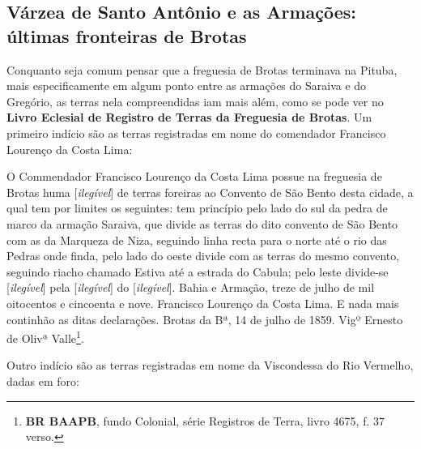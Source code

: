 \subsection{Várzea de Santo Antônio e as Armações: últimas fronteiras de Brotas}

Conquanto seja comum pensar que a freguesia de Brotas terminava na Pituba, mais especificamente em algum ponto entre as armações do Saraiva e do Gregório, as terras nela compreendidas iam mais além, como se pode ver no \textbf{Livro Eclesial de Registro de Terras da Freguesia de Brotas}. Um primeiro indício são as terras registradas em nome do comendador Francisco Lourenço da Costa Lima:

\begin{citacao}
O Commendador Francisco Lourenço da Costa Lima possue na freguesia de Brotas huma [\textit{ilegível}] de terras foreiras ao Convento de São Bento desta cidade, a qual tem por limites os seguintes: tem princípio pelo lado do sul da pedra de marco da armação Saraiva, que divide as terras do dito convento de São Bento com as da Marqueza de Niza, seguindo linha recta para o norte até o rio das Pedras onde finda, pelo lado do oeste divide com as terras do mesmo convento, seguindo riacho chamado Estiva até a estrada do Cabula; pelo leste divide-se [\textit{ilegível}] pela [\textit{ilegível}] do [\textit{ilegível}]. Bahia e Armação, treze de julho de mil oitocentos e cincoenta e nove. Francisco Lourenço da Costa Lima. E nada mais continhão as ditas declarações. Brotas da Bª, 14 de julho de 1859. Vigº Ernesto de Olivª Valle\footnote{\textbf{BR BAAPB}, fundo Colonial, série Registros de Terra, livro 4675, f. 37 verso.}.
\end{citacao}

Outro indício são as terras registradas em nome da Viscondessa do Rio Vermelho, dadas em foro:


